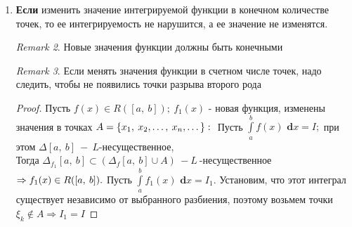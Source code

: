 \documentclass[a4paper,12pt, centered]{bookest}
\newtheorem{theorem}{Theorem}[section]
\theoremstyle{remark}
\newtheorem*{remark}{Remark}
\newcommand\tab[1][1cm]{\hspace*{#1}}
\newcommand\dx{\textbf{ d}x}
\begin{document}
\begin{enumerate}
\begin{theorem}
		\begin{proof}
			$f(x)\in C([a,\>b])\Rightarrow m=\inf\limits_{x\in[a,\>b]}f(x)=\min\limits_{x\in[a,\>b]}f(x),$ причем $\\\exists x',\>x''\in[a,\>b]:\>f(x')=m,\>f(x'')=M.\\(10)\Rightarrow m(b-a)\leq\int\limits_{a}^{b}f(x)\dx\leq M(b-a)\tab|\>:(b-a)\\m\leq\frac1{b-a}\int\limits_{a}^{b}f(x)\dx\leq M.\\$ Непрерывная функция принимает все промежуточные на отрезке $[a,\>b]\Rightarrow\\\Rightarrow\exists\xi\in[a,\>b]:\>f(\xi)-\frac1{b-a}\int\limits_{a}^{b}f(x)\dx.$ $$\left(\frac1{b-a}\int\limits_{a}^{b}f(x)\dx\in[m,\>M]\right)\Rightarrow\int\limits_{a}^{b}f(x)\dx=f(\xi)(b-a)$$
		\end{proof}
		\begin{remark}$\\$
			Если $a<b$, то замечание аналогично предыдущему. Величина $\frac1{b-a}\int\limits_{a}^{b}f(x)\dx$ - среднее значение $f(x)$ на $[a,\>b].$
		\end{remark}
	\end{theorem}
	\item \textbf{Если} изменить значение интегрируемой функции в конечном количестве точек, то ее интегрируемость не нарушится, а ее значение не изменятся. \begin{remark}
		Новые значения функции должны быть конечными 
	\end{remark} \begin{remark}
		Если менять значения функции в счетном числе точек, надо следить, чтобы не появились точки разрыва второго рода	\end{remark} \begin{proof}
			Пусть $f(x)\in R([a,\>b]);\>f_1(x)$ - новая функция, изменены значения в точках $A=\{x_1,\>x_2,\dots,\>x_n,\dots\}:\\$ Пусть $\int\limits_{a}^{b}f(x)\dx=I;$ при этом $\Delta[a,\>b]\>-\>L$-несущественное,\\ Тогда $\Delta_{f_1}[a,\>b]\subset(\Delta_f[a,\>b]\cup A)\>-L\>$-несущественное $\Rightarrow f_1(x)\in R([a,\>b]).\\$ Пусть $\int\limits_{a}^{b}f_1(x)\dx=I_1.$ Установим, что этот интеграл существует независимо от выбранного разбиения, поэтому возьмем точки $\xi_k\not\in A\Rightarrow I_1=I$
		\end{proof} 			
\end{enumerate}
\end{document}
